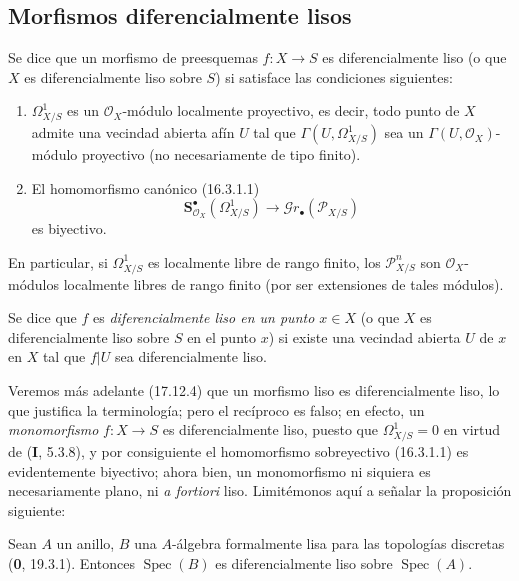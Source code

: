 \subsection{Morfismos diferencialmente lisos}
\label{IV.16.10}

\begin{definition}[16.10.1]
\label{IV.16.10.1}
Se dice que un morfismo de preesquemas $f:X\to S$ es
diferencialmente liso (o que $X$ es diferencialmente
liso sobre $S$) si satisface las condiciones siguientes:
\begin{enumerate}
  \item[\textup{(i)}] $\varOmega_{X/S}^1$ es un $\mathcal{O}_X$-módulo localmente
  proyectivo, es decir, todo punto de $X$ admite una vecindad abierta
  afín $U$ tal que $\Gamma(U,\varOmega_{X/S}^1)$ sea un
  $\Gamma(U,\mathcal{O}_X)$-módulo proyectivo (no necesariamente de tipo
  finito).
  \item[\textup{(ii)}] El homomorfismo canónico \textup{(16.3.1.1)}
  \[
    \mathbf{S}_{\mathcal{O}_X}^{\bullet}(\varOmega_{X/S}^1)
    \longrightarrow\mathscr{G}r_{\bullet}(\mathscr{P}_{X/S})
  \]
  es biyectivo.
\end{enumerate}
En particular, si $\varOmega_{X/S}^1$ es localmente libre de rango finito, los
$\mathscr{P}_{X/S}^n$ son $\mathcal{O}_X$-módulos localmente libres de
rango finito \textup{(por ser extensiones de tales módulos)}.
\end{definition}

Se dice que $f$ es \emph{diferencialmente liso en un punto $x\in X$} (o
que $X$ es diferencialmente liso sobre $S$ en el punto $x$) si existe una
vecindad abierta $U$ de $x$ en $X$ tal que $f|U$ sea diferencialmente
liso.

Veremos más adelante (17.12.4) que un morfismo liso es diferencialmente
liso, lo que justifica la terminología; pero el recíproco es falso; en
efecto, un \emph{monomorfismo} $f:X\to S$ es diferencialmente liso,
puesto que $\varOmega_{X/S}^1=0$ en virtud de (\textbf I, 5.3.8), y por consiguiente
el homomorfismo sobreyectivo (16.3.1.1) es evidentemente biyectivo; ahora
bien, un monomorfismo ni siquiera es necesariamente plano, ni \emph{a fortiori}
liso. Limitémonos aquí a señalar la proposición siguiente:

\begin{proposition}[16.10.2]
\label{IV.16.10.2}
Sean $A$ un anillo, $B$ una $A$-álgebra formalmente lisa para las
topologías discretas \textup{(\textbf 0, 19.3.1)}. Entonces $\operatorname{Spec}(B)$ es
diferencialmente liso sobre $\operatorname{Spec}(A)$.
\end{proposition}

